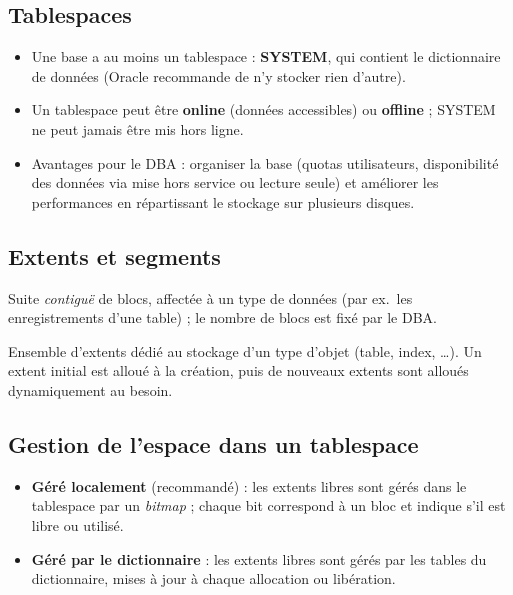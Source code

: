 \documentclass[11pt,a4paper]{article}
\begin{document}
\subsection{Tablespaces}
\begin{itemize}[nosep]
\item Une base a au moins un tablespace : \textbf{SYSTEM}, qui contient le dictionnaire de données (Oracle recommande de n'y stocker rien d'autre).
\item Un tablespace peut être \textbf{online} (données accessibles) ou \textbf{offline} ; SYSTEM ne peut jamais être mis hors ligne.
\item Avantages pour le DBA : organiser la base (quotas utilisateurs, disponibilité des données via mise hors service ou lecture seule) et améliorer les performances en répartissant le stockage sur plusieurs disques.
\end{itemize}

\subsection{Extents et segments}
\begin{definition}
Suite \emph{contiguë} de blocs, affectée à un type de données (par ex.\ les enregistrements d'une table) ; le nombre de blocs est fixé par le DBA.
\end{definition}
\begin{definition}[Segment]
Ensemble d'extents dédié au stockage d'un type d'objet (table, index, \dots). Un extent initial est alloué à la création, puis de nouveaux extents sont alloués dynamiquement au besoin.
\end{definition}

\subsection{Gestion de l'espace dans un tablespace}
\begin{itemize}[nosep]
\item \textbf{Géré localement} (recommandé) : les extents libres sont gérés dans le tablespace par un \emph{bitmap} ; chaque bit correspond à un bloc et indique s'il est libre ou utilisé.
\item \textbf{Géré par le dictionnaire} : les extents libres sont gérés par les tables du dictionnaire, mises à jour à chaque allocation ou libération.
\end{itemize}
\end{document}
